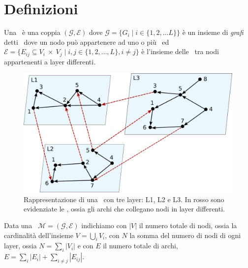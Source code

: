 \chapter{Definizioni}

\begin{definizione} 
    \label{def:muln}
    Una \muln\ è una coppia $(\mathcal{G}, \mathcal{E} )$ dove
    $\mathcal{G} = \{G_i \mid i \in \{1, 2, \dots L\}\}$ è un insieme di \textit{grafi} 
    detti \layers\ dove un nodo può appartenere ad uno o più \layers\ ed 
    $\mathcal{E} = \{E_{ij} \subseteq V_i~\times~V_j \mid i,j \in \{1, 2, \dots, L\}, i \neq j\}$
    è l'insieme delle \interc\ tra nodi appartenenti a layer differenti.
\end{definizione}
%     
\begin{figure}
    \centering
    \includegraphics[height=0.3\textheight]{img/mlexample1.pdf}
    \caption{Rappresentazione di una \muln\ con tre layer: L1, L2 e L3.
    In rosso sono evidenziate le \interc, ossia gli archi che collegano nodi in 
    layer differenti.}
    \label{fig:mlexample}
\end{figure}
% 

\begin{definizione}
    Data una \muln\ $\mathcal{M}=(\mathcal{G}, \mathcal{E})$ 
    indichiamo con $|V|$ il numero totale di nodi, ossia la cardinalità dell'insieme $V = \bigcup\limits_{i} V_i$,
    con $N$ la somma del numero di nodi di ogni layer, ossia $N = \sum_{i}{|V_i|}$
    e con $E$ il numero totale di archi, $E = \sum_{i} |E_i| + \sum_{i \neq j} |E_{ij}|$.    
\end{definizione}

